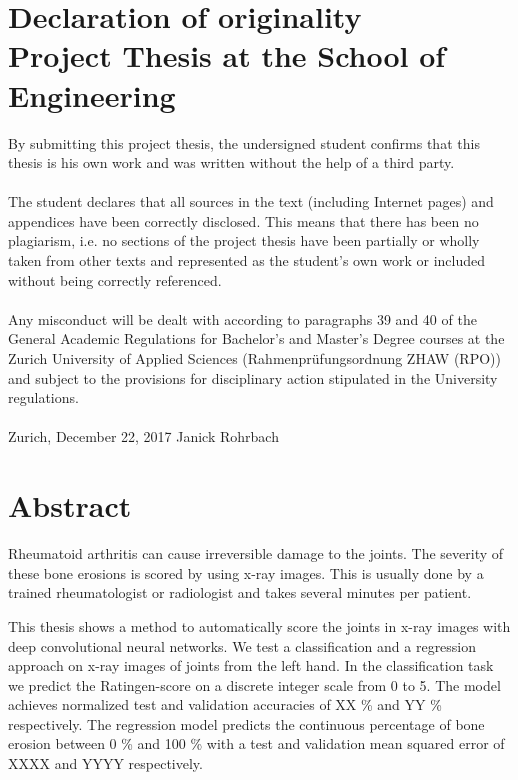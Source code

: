 \documentclass[12pt]{article}
\begin{document}
\section*{Declaration of originality\\ \large{Project Thesis at the School of Engineering}}
By submitting this project thesis, the undersigned student confirms that this thesis is his own work and was written without the help of a third party. \\
\\
The student declares that all sources in the text (including Internet pages) and appendices have been correctly disclosed. This means that there has been no plagiarism, i.e. no sections of the project thesis have been partially or wholly taken from other texts and represented as the student’s own work or included without being correctly referenced. \\
\\
Any misconduct will be dealt with according to paragraphs 39 and 40 of the General Academic Regulations for Bachelor’s and Master’s Degree courses at the Zurich University of Applied Sciences (Rahmenprüfungsordnung ZHAW (RPO)) and subject to the provisions for disciplinary action stipulated in the University regulations.\\
\vspace{3cm} \\
Zurich, December 22, 2017 \hspace{5cm} Janick Rohrbach

\newpage

\section*{Abstract}

Rheumatoid arthritis can cause irreversible damage to the joints. The severity of these bone erosions is scored by using x-ray images. This is usually done by a trained rheumatologist or radiologist and takes several minutes per patient.

This thesis shows a method to automatically score the joints in x-ray images with deep convolutional neural networks. We test a classification and a regression approach on x-ray images of joints from the left hand. In the classification task we predict the Ratingen-score on a discrete integer scale from 0 to 5. The model achieves normalized test and validation accuracies of XX \% and YY \% respectively. The regression model predicts the continuous percentage of bone erosion between 0 \% and 100 \% with a test and validation mean squared error of XXXX and YYYY respectively.
\end{document}
